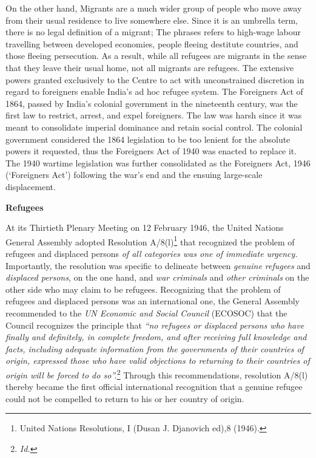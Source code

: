 \begin{multicols}{2}
\noi
On the other hand, Migrants are a much wider group of people who move away from their
usual residence to live somewhere else. Since it is an umbrella term, there is no legal
definition of a migrant; The phrases refers to high-wage labour travelling between developed
economies, people fleeing destitute countries, and those fleeing persecution. As a result,
while all refugees are migrants in the sense that they leave their usual home, not all migrants
are refugees. The extensive powers granted exclusively to the Centre to act with
unconstrained discretion in regard to foreigners enable India's ad hoc refugee system. The
Foreigners Act of 1864, passed by India's colonial government in the nineteenth century, was
the first law to restrict, arrest, and expel foreigners. The law was harsh since it was meant to
consolidate imperial dominance and retain social control. The colonial government
considered the 1864 legislation to be too lenient for the absolute powers it requested, thus the
Foreigners Act of 1940 was enacted to replace it. The 1940 wartime legislation was further
consolidated as the Foreigners Act, 1946 (‘Foreigners Act') following the war's end and the
ensuing large-scale displacement.


\noi
{\normalsize\bfseries {Refugees}}

\noi
At its Thirtieth Plenary Meeting on 12 February 1946, the United Nations General Assembly
adopted Resolution A/8(l)\footnote{United Nations Resolutions, I (Dusan J. Djanovich ed),8 (1946).} that recognized the problem of refugees and displaced persons \textit{of
all categories was one of immediate urgency.} Importantly, the resolution was specific to
delineate between \textit{genuine refugees} and \textit{displaced persons}, on the one hand, and \textit{war
criminals} and \textit{other criminals} on the other side who may claim to be refugees.
Recognizing that the problem of refugees and displaced persons was an international one, the
General Assembly recommended to the \textit{UN Economic and Social Council} (ECOSOC) that the
Council recognizes the principle that \textit{“no refugees or displaced persons who have finally and
definitely, in complete freedom, and after receiving full knowledge and facts, including
adequate information from the governments of their countries of origin, expressed those who
have valid objections to returning to their countries of origin will be forced to do so”.}\footnote{\textit{Id.}}
Through this recommendations, resolution A/8(l) thereby became the first official
international recognition that a genuine refugee could not be compelled to return to his or her
country of origin. 


\end{multicols}
